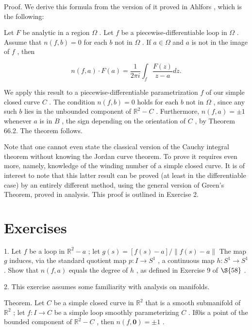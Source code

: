 Proof. We derive this formula from the version of it proved in Ahlfors 		\cite{Ahlfors1979}, which is the following:

Let \(F\) be analytic in a region \(\Omega\) . Let \(f\) be a piecewise-differentiable loop in \(\Omega\) . Assume that \(n\left( {f,b}\right)  = 0\) for each \(b\) not in \(\Omega\) . If \(a \in  \Omega\) and \(a\) is not in the image of \(f\) , then

\[
n\left( {f,a}\right)  \cdot  F\left( a\right)  = \frac{1}{2\pi i}{\int }_{f}\frac{F\left( z\right) }{z - a}{dz}.
\]

We apply this result to a piecewise-differentiable parametrization \(f\) of our simple closed curve \(C\) . The condition \(n\left( {f,b}\right)  = 0\) holds for each \(b\) not in \(\Omega\) , since any such \(b\) lies in the unbounded component of \({\mathbb{R}}^{2} - C\) . Furthermore, \(n\left( {f,a}\right)  =  \pm  1\) whenever \(a\) is in \(B\) , the sign depending on the orientation of \(C\) , by Theorem 66.2. The theorem follows.

Note that one cannot even state the classical version of the Cauchy integral theorem without knowing the Jordan curve theorem. To prove it requires even more, namely, knowledge of the winding number of a simple closed curve. It is of interest to note that this latter result can be proved (at least in the differentiable case) by an entirely different method, using the general version of Green's Theorem, proved in analysis. This proof is outlined in Exercise 2.

\section*{Exercises}

1. Let \(f\) be a loop in \({\mathbb{R}}^{2} - a\) ; let \(g\left( s\right)  = \left\lbrack  {f\left( s\right)  - a}\right\rbrack  /\parallel f\left( s\right)  - a\parallel\) The map \(g\) induces, via the standard quotient map \(p : I \rightarrow  {S}^{1}\) , a continuous map \(h : {S}^{1} \rightarrow  {S}^{1}\) . Show that \(n\left( {f,a}\right)\) equals the degree of \(h\) , as defined in Exercise 9 of \( \S {58}\) .

2. This exercise assumes some familiarity with analysis on manifolds.

Theorem. Let \(C\) be a simple closed curve in \({\mathbb{R}}^{2}\) that is a smooth submanifold of \({\mathbb{R}}^{2}\) ; let \(f : I \rightarrow  C\) be a simple loop smoothly parameterizing \(C\) . If0is a point of the bounded component of \({\mathbb{R}}^{2} - C\) , then \(n\left( {f,\mathbf{0}}\right)  =  \pm  1\) .

